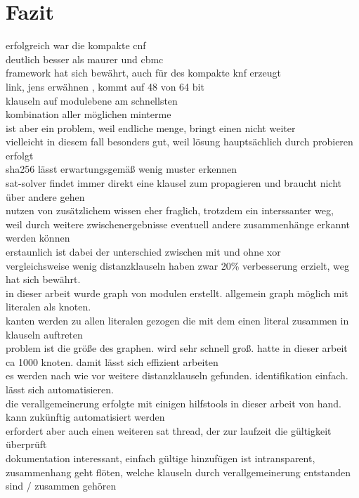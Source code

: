 \chapter{Fazit}
\label{chp:fazit}


erfolgreich war die kompakte cnf\\
deutlich besser als maurer und cbmc\\
framework hat sich bewährt, auch für des kompakte knf erzeugt\\
link, jens erwähnen \cite{trillmann}, kommt auf 48 von 64 bit\\

klauseln auf modulebene am schnellsten\\
kombination aller möglichen minterme\\
ist aber ein problem, weil endliche menge, bringt einen nicht weiter\\
vielleicht in diesem fall besonders gut, weil lösung hauptsächlich durch probieren erfolgt\\
sha256 lässt erwartungsgemäß wenig muster erkennen\\
sat-solver findet immer direkt eine klausel zum propagieren und braucht nicht über andere gehen\\

nutzen von zusätzlichem wissen eher fraglich, trotzdem ein interssanter weg,\\
weil durch weitere zwischenergebnisse eventuell andere zusammenhänge erkannt werden können\\
erstaunlich ist dabei der unterschied zwischen mit und ohne xor\\

vergleichsweise wenig distanzklauseln haben zwar 20\% verbesserung erzielt, weg hat sich bewährt.\\
in dieser arbeit wurde graph von modulen erstellt. allgemein graph möglich mit literalen als knoten.\\
kanten werden zu allen literalen gezogen die mit dem einen literal zusammen in klauseln auftreten\\
problem ist die größe des graphen. wird sehr schnell groß. hatte in dieser arbeit ca 1000 knoten. damit lässt sich effizient arbeiten\\

es werden nach wie vor weitere distanzklauseln gefunden. identifikation einfach. lässt sich automatisieren.\\
die verallgemeinerung erfolgte mit einigen hilfstools in dieser arbeit von hand. kann zukünftig automatisiert werden\\
erfordert aber auch einen weiteren sat thread, der zur laufzeit die gültigkeit überprüft\\
dokumentation interessant, einfach gültige hinzufügen ist intransparent, zusammenhang geht flöten, welche klauseln durch verallgemeinerung entstanden sind / zusammen gehören\\

